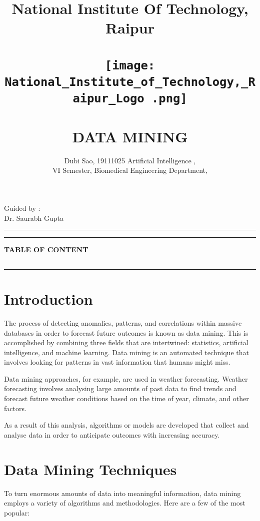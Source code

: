 \documentclass[12pt,letterpaper]{article}
\begin{document}
\title{
\textbf{National Institute Of Technology, Raipur\\ 
 \\ \texttt{[image: National\_Institute\_of\_Technology,\_Raipur\_Logo .png]}
\\ \\
DATA MINING}
}

\author{Dubi Sao, 19111025 
Artificial Intelligence ,\\ VI Semester,
        Biomedical Engineering Department,\\
        }
\date{}
\maketitle
\begin{flushright}
    Guided by :\\
    Dr. Saurabh Gupta
\end{flushright}
\rule{\textwidth}{1pt}
\begin{abstract}



\end{abstract}
\rule{\textwidth}{1pt}
\newpage
\textbf{TABLE OF CONTENT}\\
\rule{\textwidth}{1pt}
\tableofcontents
\rule{\textwidth}{1pt}

\section{Introduction}
The process of detecting anomalies, patterns, and correlations within massive databases in order to forecast future outcomes is known as data mining. This is accomplished by combining three fields that are intertwined: statistics, artificial intelligence, and machine learning. Data mining is an automated technique that involves looking for patterns in vast information that humans might miss.


Data mining approaches, for example, are used in weather forecasting. Weather forecasting involves analysing large amounts of past data to find trends and forecast future weather conditions based on the time of year, climate, and other factors.



As a result of this analysis, algorithms or models are developed that collect and analyse data in order to anticipate outcomes with increasing accuracy.
\section{Data Mining Techniques}
To turn enormous amounts of data into meaningful information, data mining employs a variety of algorithms and methodologies. Here are a few of the most popular:
\end{document}
